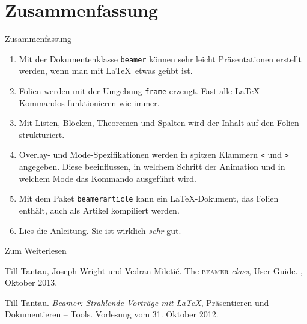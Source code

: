 \section*{Zusammenfassung}

\begin{frame}[fragile]{Zusammenfassung}
  \begin{enumerate}
    \item Mit der Dokumentenklasse \lstinline-beamer- können \alert{sehr
          leicht Präsentationen erstellt} werden, wenn man mit \LaTeX\ etwas geübt ist.
    \item Folien werden mit der Umgebung \lstinline-frame- erzeugt.
      Fast alle \alert{\LaTeX-Kommandos funktionieren wie immer}.
    \item Mit \alert{Listen, Blöcken, Theoremen und Spalten} wird
      der Inhalt auf den Folien \alert{strukturiert}.
    \item \alert{Overlay- und Mode-Spezifikationen} werden in spitzen
      Klammern \lstinline-<- und \lstinline->- angegeben. Diese beeinflussen, in welchem
      \alert{Schritt der Animation} und in welchem \alert{Mode}
      das Kommando ausgeführt wird.
    \item Mit dem Paket \lstinline-beamerarticle- kann ein \LaTeX-Dokument,
      das Folien enthält, auch \alert{als Artikel kompiliert} werden.
    \item \alert{Lies die Anleitung.} Sie ist wirklich \emph{sehr} gut.
  \end{enumerate}
\end{frame}

\begin{Frame}{Zum Weiterlesen}
  \begin{mybib}
      Till Tantau, Joseph Wright und Vedran Mileti\'c.
      \newblock The \textsc{beamer} \textit{class}, User Guide.
      \newblock {}, Oktober 2013.

      Till Tantau.
      \newblock \emph{Beamer: Strahlende Vorträge mit \LaTeX},
      \newblock Präsentieren und Dokumentieren -- Tools.
      \newblock Vorlesung vom 31. Oktober 2012.
  \end{mybib}
\end{Frame}
